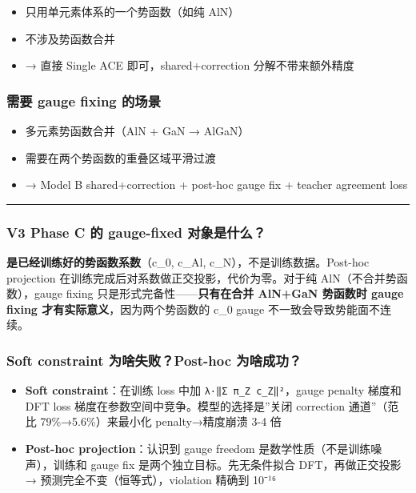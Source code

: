 \documentclass[
  12pt,
]{ctexart}
\providecommand{\tightlist}{%
  \setlength{\itemsep}{0pt}\setlength{\parskip}{0pt}}
\begin{document}
\begin{itemize}
\tightlist
\item
  只用单元素体系的一个势函数（如纯 AlN）
\item
  不涉及势函数合并
\item
  → 直接 Single ACE 即可，shared+correction 分解不带来额外精度
\end{itemize}

\subsubsection{需要 gauge fixing
的场景}\label{ux9700ux8981-gauge-fixing-ux7684ux573aux666f}

\begin{itemize}
\tightlist
\item
  多元素势函数合并（AlN + GaN → AlGaN）
\item
  需要在两个势函数的重叠区域平滑过渡
\item
  → Model B shared+correction + post-hoc gauge fix + teacher agreement
  loss
\end{itemize}

\begin{center}\rule{0.5\linewidth}{0.5pt}\end{center}

\subsubsection{V3 Phase C 的 gauge-fixed
对象是什么？}\label{v3-phase-c-ux7684-gauge-fixed-ux5bf9ux8c61ux662fux4ec0ux4e48}

\textbf{是已经训练好的势函数系数}（c\_0, c\_Al,
c\_N），不是训练数据。Post-hoc projection
在训练完成后对系数做正交投影，代价为零。对于纯
AlN（不合并势函数），gauge fixing 只是形式完备性------\textbf{只有在合并
AlN+GaN 势函数时 gauge fixing 才有实际意义}，因为两个势函数的 c\_0 gauge
不一致会导致势能面不连续。

\subsubsection{Soft constraint 为啥失败？Post-hoc
为啥成功？}\label{soft-constraint-ux4e3aux5565ux5931ux8d25post-hoc-ux4e3aux5565ux6210ux529f}

\begin{itemize}
\tightlist
\item
  \textbf{Soft constraint}：在训练 loss 中加
  \texttt{λ·‖Σ\ π\_Z\ c\_Z‖²}，gauge penalty 梯度和 DFT loss
  梯度在参数空间中竞争。模型的选择是''关闭 correction 通道''（范比
  79\%→5.6\%）来最小化 penalty→精度崩溃 3-4 倍
\item
  \textbf{Post-hoc projection}：认识到 gauge freedom
  是数学性质（不是训练噪声），训练和 gauge fix
  是两个独立目标。先无条件拟合 DFT，再做正交投影 →
  预测完全不变（恒等式），violation 精确到 10⁻¹⁶
\end{itemize}
\end{document}
